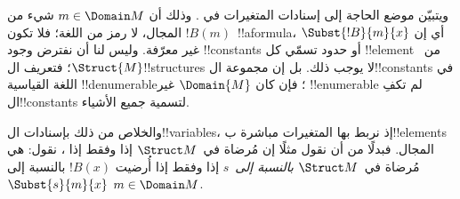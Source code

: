 \documentclass[../../../include/open-logic-section]{subfiles}
\begin{document}
\begin{explain}
ويتبيّن موضع الحاجة إلى إسنادات المتغيرات في
. وذلك أن $m \in \Domain M$
شيء من المجال، لا رمز من اللغة؛ فلا تكون $!B(m)$~!!a{formula}،
أي إن $\Subst{!B}{m}{x}$ غير معرّفة. وليس لنا أن نفترض وجود
!!{constant}s أو حدود تسمّي كل !!{element} من~$\Struct{M}$؛
فتعريف ال!!{structure}s لا يوجب ذلك. بل إن مجموعة
ال!!{constant}s في اللغة القياسية !!{denumerable}؛ فإن كان
$\Domain{M}$ غير !!{enumerable} لم تكفِ ال!!{constant}s
لتسمية جميع الأشياء.

والخلاص من ذلك بإسنادات ال!!{variable}s، إذ نربط بها المتغيرات
مباشرة ب!!{element}s المجال. فبدلًا من أن نقول مثلًا إن
 مُرضاة
في~$\Struct M$ إذا وفقط إذا
،
نقول: هي مُرضاة في~$\Struct M$ \emph{بالنسبة إلى}~$s$ إذا وفقط
إذا أُرضيت $!B(x)$ بالنسبة إلى~$\Subst{s}{m}{x}$
 $m \in \Domain M$.
\end{explain}
\end{document}
